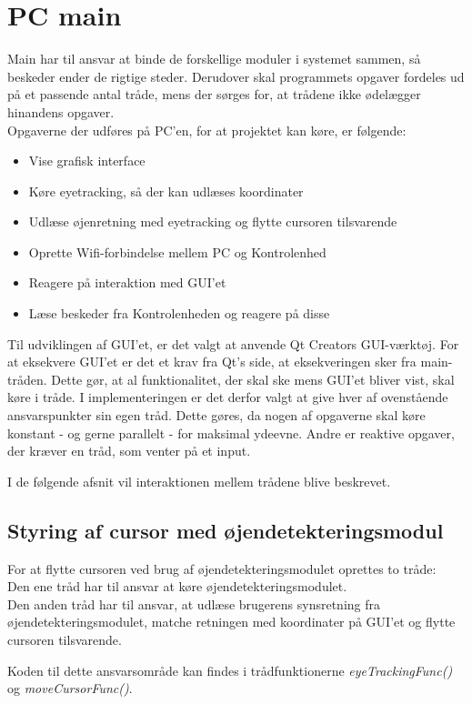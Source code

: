 \section{PC main}
Main har til ansvar at binde de forskellige moduler i systemet sammen, så beskeder ender de rigtige steder.
Derudover skal programmets opgaver fordeles ud på et passende antal tråde, mens der sørges for, at trådene ikke ødelægger hinandens opgaver.\\
Opgaverne der udføres på PC'en, for at projektet kan køre, er følgende:
	\begin{itemize}
	\item Vise grafisk interface
	\item Køre eyetracking, så der kan udlæses koordinater
	\item Udlæse øjenretning med eyetracking og flytte cursoren tilsvarende
	\item Oprette Wifi-forbindelse mellem PC og Kontrolenhed
	\item Reagere på interaktion med GUI'et
	\item Læse beskeder fra Kontrolenheden og reagere på disse
	\end{itemize}

Til udviklingen af GUI'et, er det valgt at anvende Qt Creators GUI-værktøj.
For at eksekvere GUI'et er det et krav fra Qt's side, at eksekveringen sker fra main-tråden. 
Dette gør, at al funktionalitet, der skal ske mens GUI'et bliver vist, skal køre i tråde.
I implementeringen er det derfor valgt at give hver af ovenstående ansvarspunkter sin egen tråd. 
Dette gøres, da nogen af opgaverne skal køre konstant - og gerne parallelt - for maksimal ydeevne.
Andre er reaktive opgaver, der kræver en tråd, som venter på et input.

I de følgende afsnit vil interaktionen mellem trådene blive beskrevet.

\subsection{Styring af cursor med øjendetekteringsmodul}
For at flytte cursoren ved brug af øjendetekteringsmodulet oprettes to tråde: \\
Den ene tråd har til ansvar at køre øjendetekteringsmodulet.\\
Den anden tråd har til ansvar, at udlæse brugerens synsretning fra øjendetekteringsmodulet, matche retningen med koordinater på GUI'et og flytte cursoren tilsvarende.

Koden til dette ansvarsområde kan findes i trådfunktionerne \textit{eyeTrackingFunc()} og \textit{moveCursorFunc()}.


